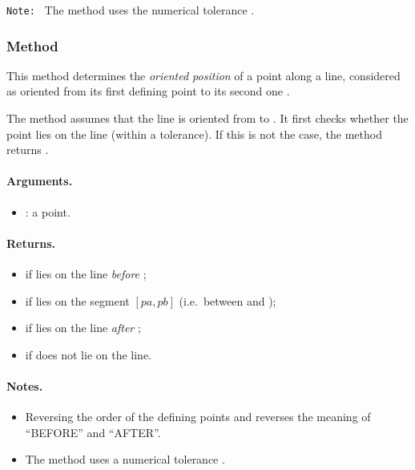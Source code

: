 \texttt{Note: } The method uses the numerical tolerance .


\subsubsection{Method }
\label{ssub:method_line_where_on_line}

This method determines the \emph{oriented position} of a point  along a line,
considered as oriented from its first defining point  to its second one
.

\medskip

The method assumes that the line is oriented from  to .
It first checks whether the point lies on the line (within a tolerance).
If this is not the case, the method returns .


\medskip

\paragraph{Arguments.}
\begin{itemize}
  \item {}: a point.
\end{itemize}

\paragraph{Returns.}
\begin{itemize}
  \item {} if  lies on the line \emph{before} ;
  \item {} if  lies on the segment $[pa,pb]$ (i.e.\ between  and );
  \item {} if  lies on the line \emph{after} ;
  \item {} if  does not lie on the line.
\end{itemize}

\paragraph{Notes.}
\begin{itemize}
  \item Reversing the order of the defining points  and 
  reverses the meaning of ``BEFORE'' and ``AFTER''.
  \item The method uses a numerical tolerance .
\end{itemize}





